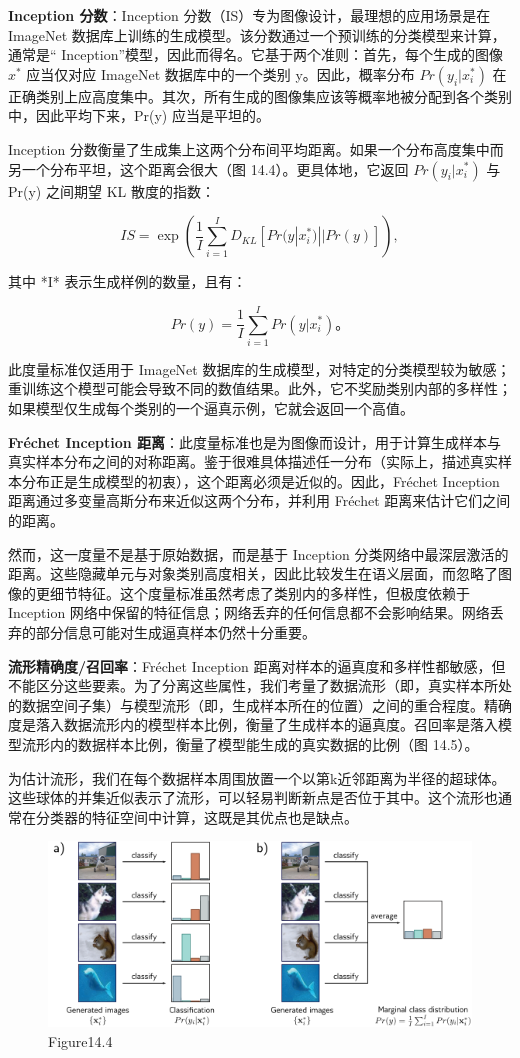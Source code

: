 \textbf{Inception 分数}：Inception 分数（IS）专为图像设计，最理想的应用场景是在 ImageNet 数据库上训练的生成模型。该分数通过一个预训练的分类模型来计算，通常是“ Inception”模型，因此而得名。它基于两个准则：首先，每个生成的图像 \(x^*\) 应当仅对应 ImageNet 数据库中的一个类别 y。因此，概率分布 \(Pr(y_i|x^*_i)\) 在正确类别上应高度集中。其次，所有生成的图像集应该等概率地被分配到各个类别中，因此平均下来，Pr(y) 应当是平坦的。

Inception 分数衡量了生成集上这两个分布间平均距离。如果一个分布高度集中而另一个分布平坦，这个距离会很大（图 14.4）。更具体地，它返回 \(Pr(y_i|x^*_i)\) 与 Pr(y) 之间期望 KL 散度的指数：

\[
IS = \exp \left( \frac{1}{I} \sum_{i=1}^{I} D_{KL} [ Pr(y|x_i^*) || Pr(y) ] \right),
\]

其中 *I* 表示生成样例的数量，且有：

\[
Pr(y) = \frac{1}{I} \sum_{i=1}^{I} Pr(y|x_i^*)。
\]

此度量标准仅适用于 ImageNet 数据库的生成模型，对特定的分类模型较为敏感；重训练这个模型可能会导致不同的数值结果。此外，它不奖励类别内部的多样性；如果模型仅生成每个类别的一个逼真示例，它就会返回一个高值。

\textbf{Fréchet Inception 距离}：此度量标准也是为图像而设计，用于计算生成样本与真实样本分布之间的对称距离。鉴于很难具体描述任一分布（实际上，描述真实样本分布正是生成模型的初衷），这个距离必须是近似的。因此，Fréchet Inception 距离通过多变量高斯分布来近似这两个分布，并利用 Fréchet 距离来估计它们之间的距离。

然而，这一度量不是基于原始数据，而是基于 Inception 分类网络中最深层激活的距离。这些隐藏单元与对象类别高度相关，因此比较发生在语义层面，而忽略了图像的更细节特征。这个度量标准虽然考虑了类别内的多样性，但极度依赖于 Inception 网络中保留的特征信息；网络丢弃的任何信息都不会影响结果。网络丢弃的部分信息可能对生成逼真样本仍然十分重要。

\textbf{流形精确度/召回率}：Fréchet Inception 距离对样本的逼真度和多样性都敏感，但不能区分这些要素。为了分离这些属性，我们考量了数据流形（即，真实样本所处的数据空间子集）与模型流形（即，生成样本所在的位置）之间的重合程度。精确度是落入数据流形内的模型样本比例，衡量了生成样本的逼真度。召回率是落入模型流形内的数据样本比例，衡量了模型能生成的真实数据的比例（图 14.5）。

为估计流形，我们在每个数据样本周围放置一个以第k近邻距离为半径的超球体。这些球体的并集近似表示了流形，可以轻易判断新点是否位于其中。这个流形也通常在分类器的特征空间中计算，这既是其优点也是缺点。

\begin{figure}[h!]
\centering
\includegraphics[width=0.7\linewidth]{png/chapter14/UnsupInception.png}
\caption{Figure14.4}
\end{figure}

